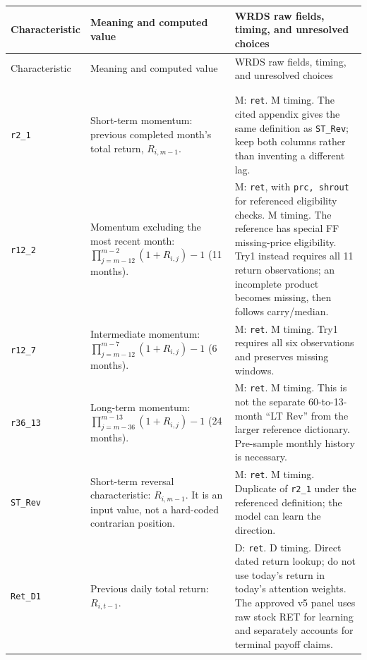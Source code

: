\documentclass[11pt]{article}
\begin{document}
\begingroup
\setlength{\tabcolsep}{4pt}
\renewcommand{\arraystretch}{1.18}
\small
\begin{longtable}{@{}>{\raggedright\arraybackslash}p{}>{\raggedright\arraybackslash}p{}>{\raggedright\arraybackslash}p{}@{}}
\toprule
Characteristic & Meaning and computed value & WRDS raw fields, timing, and unresolved choices \\
\midrule
\endfirsthead
\toprule Characteristic & Meaning and computed value & WRDS raw fields, timing, and unresolved choices \\
\midrule
\endhead
\midrule \multicolumn{3}{r}{\emph{Continued on next page}} \\
\endfoot
\bottomrule
\endlastfoot
\multicolumn{3}{@{}l}{\textbf{Past returns: 8 characteristics}} \\*
\addlinespace
\texttt{r2\_1} & Short-term momentum: previous completed month's total return, $R_{i,m-1}$. & M: \texttt{ret}. M timing. The cited appendix gives the same definition as \texttt{ST\_Rev}; keep both columns rather than inventing a different lag. \\
\texttt{r12\_2} & Momentum excluding the most recent month: $\prod_{j=m-12}^{m-2}(1+R_{i,j})-1$ (11 months). & M: \texttt{ret}, with \texttt{prc, shrout} for referenced eligibility checks. M timing. The reference has special FF missing-price eligibility. Try1 instead requires all 11 return observations; an incomplete product becomes missing, then follows carry/median. \\
\texttt{r12\_7} & Intermediate momentum: $\prod_{j=m-12}^{m-7}(1+R_{i,j})-1$ (6 months). & M: \texttt{ret}. M timing. Try1 requires all six observations and preserves missing windows. \\
\texttt{r36\_13} & Long-term momentum: $\prod_{j=m-36}^{m-13}(1+R_{i,j})-1$ (24 months). & M: \texttt{ret}. M timing. This is not the separate 60-to-13-month ``LT Rev'' from the larger reference dictionary. Pre-sample monthly history is necessary. \\
\texttt{ST\_Rev} & Short-term reversal characteristic: $R_{i,m-1}$. It is an input value, not a hard-coded contrarian position. & M: \texttt{ret}. M timing. Duplicate of \texttt{r2\_1} under the referenced definition; the model can learn the direction. \\
\texttt{Ret\_D1} & Previous daily total return: $R_{i,t-1}$. & D: \texttt{ret}. D timing. Direct dated return lookup; do not use today's return in today's attention weights. The approved v5 panel uses raw stock RET for learning and separately accounts for terminal payoff claims. \\

\end{longtable}
\end{document}
